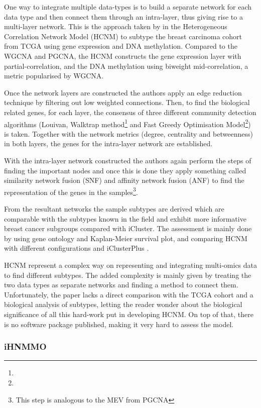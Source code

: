 One way to integrate multiple data-types is to build a separate network for each data type and then connect them through an intra-layer, thus giving rise to a multi-layer network. This is the approach taken by \citet{Vangimalla2021-fc} in the Heterogeneous Correlation Network Model (HCNM) to subtype the breast carcinoma cohort from TCGA using gene expression and DNA methylation. Compared to the WGCNA and PGCNA, the HCNM constructs the gene expression layer with partial-correlation, and the DNA methylation using biweight mid-correlation, a metric popularised by WGCNA. 

Once the network layers are constructed the authors apply an edge reduction technique by filtering out low weighted connections. Then, to find the biological related genes, for each layer, the consensus of three different community detection algorithms (Louivan\cite{Blondel2008-ik}, Walktrap method\footnote{} and Fast Greedy Optimisation Model\footnote{}) is taken. Together with the network metrics (degree, centrality and betweenness) in both layers, the genes for the intra-layer network are established.

With the intra-layer network constructed the authors again perform the steps of finding the important nodes and once this is done they apply something called similarity network fusion (SNF) and affinity network fusion (ANF) to find the representation of the genes in the samples\footnote{This step is analogous to the MEV from PGCNA}. 

From the resultant networks the sample subtypes are derived which are comparable with the subtypes known in the field and exhibit more informative breast cancer subgroups compared with iCluster. The assessment is mainly done by using gene ontology and Kaplan-Meier survival plot, and comparing HCNM with different configurations and iClusterPlus \citet{Mo2013-zi}. 

HCNM represent a complex way on representing and integrating multi-omics data to find different subtypes. The added complexity is mainly given by treating the two data types as separate networks and finding a method to connect them. Unfortunately, the paper lacks a direct comparison with the TCGA cohort and a biological analysis of subtypes, letting the reader wonder about the biological significance of all this hard-work put in developing HCNM. On top of that, there is no software package published, making it very hard to assess the model. 

\subsubsection{iHNMMO}


